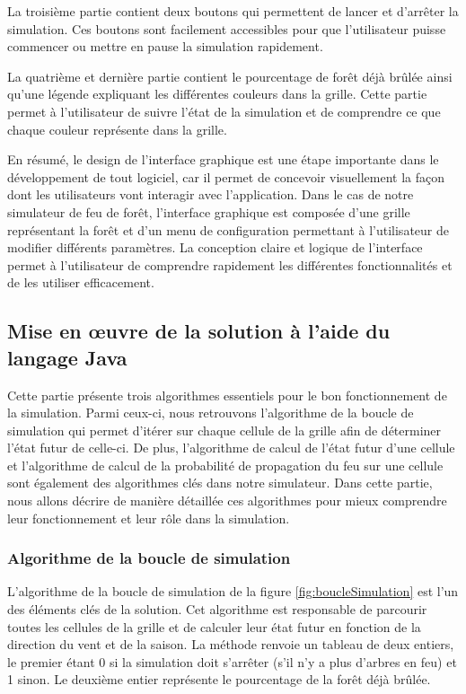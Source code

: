 La troisième partie contient deux boutons qui permettent de lancer et d'arrêter la simulation. Ces boutons sont facilement accessibles pour que l'utilisateur puisse commencer ou mettre en pause la simulation rapidement.

La quatrième et dernière partie contient le pourcentage de forêt déjà brûlée ainsi qu'une légende expliquant les différentes couleurs dans la grille. Cette partie permet à l'utilisateur de suivre l'état de la simulation et de comprendre ce que chaque couleur représente dans la grille.

En résumé, le design de l'interface graphique est une étape importante dans le développement de tout logiciel, car il permet de concevoir visuellement la façon dont les utilisateurs vont interagir avec l'application. Dans le cas de notre simulateur de feu de forêt, l'interface graphique est composée d'une grille représentant la forêt et d'un menu de configuration permettant à l'utilisateur de modifier différents paramètres. La conception claire et logique de l'interface permet à l'utilisateur de comprendre rapidement les différentes fonctionnalités et de les utiliser efficacement.

\subsection{Mise en œuvre de la solution à l’aide du langage Java}

Cette partie présente trois algorithmes essentiels pour le bon fonctionnement de la simulation. Parmi ceux-ci, nous retrouvons l'algorithme de la boucle de simulation qui permet d'itérer sur chaque cellule de la grille afin de déterminer l'état futur de celle-ci. De plus, l'algorithme de calcul de l'état futur d'une cellule et l'algorithme de calcul de la probabilité de propagation du feu sur une cellule sont également des algorithmes clés dans notre simulateur. Dans cette partie, nous allons décrire de manière détaillée ces algorithmes pour mieux comprendre leur fonctionnement et leur rôle dans la simulation.

\subsubsection{Algorithme de la boucle de simulation}

L'algorithme de la boucle de simulation de la figure \ref{fig:boucleSimulation} est l'un des éléments clés de la solution. Cet algorithme est responsable de parcourir toutes les cellules de la grille et de calculer leur état futur en fonction de la direction du vent et de la saison. La méthode renvoie un tableau de deux entiers, le premier étant 0 si la simulation doit s'arrêter (s'il n'y a plus d'arbres en feu) et 1 sinon. Le deuxième entier représente le pourcentage de la forêt déjà brûlée.

